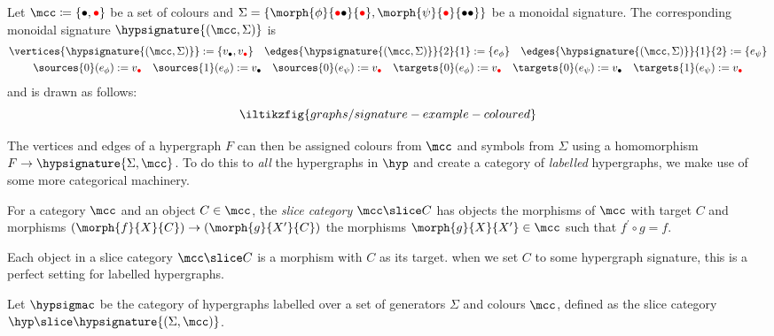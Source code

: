 \begin{example}\label{ex:labelled-hypergraph}
    Let \(\mcc \coloneqq \{\bullet,\redbullet\}\) be a set of colours and
    \(\Sigma = \{\morph{\phi}{\redbullet\bullet}{\redbullet}, \morph{\psi}{\redbullet}{\bullet\bullet}\}\) be a monoidal
    signature.
    The corresponding monoidal signature \(\hypsignature{(\mcc,\Sigma)}\) is
    \begin{gather*}
        \vertices{\hypsignature{(\mcc,\Sigma)}} := \{v_{\bullet},v_{\redbullet}\}
        \quad
        \edges{\hypsignature{(\mcc,\Sigma)}}{2}{1} := \{e_\phi\}
        \quad
        \edges{\hypsignature{(\mcc,\Sigma)}}{1}{2} := \{e_\psi\}
        \\
        \sources{0}(e_\phi) := v_{\redbullet}
        \quad
        \sources{1}(e_\phi) := v_{\bullet}
        \quad
        \sources{0}(e_\psi) := v_{\redbullet}
        \quad
        \targets{0}(e_\phi) := v_{\redbullet}
        \quad
        \targets{0}(e_\psi) := v_{\bullet}
        \quad
        \targets{1}(e_\psi) := v_{\redbullet}
    \end{gather*}
    and is drawn as follows:
    \[
        \iltikzfig{graphs/signature-example-coloured}
    \]
\end{example}

The vertices and edges of a hypergraph \(F\) can then be assigned colours from
\(\mcc\) and symbols from \(\Sigma\) using a homomorphism
\(F \to \hypsignature{\Sigma,\mcc}\).
To do this to \emph{all} the hypergraphs in \(\hyp\) and create a category of
\emph{labelled} hypergraphs, we make use of some more categorical machinery.

\begin{definition}
    For a category \(\mcc\) and an object \(C \in \mcc\), the
    \emph{slice category} \(\mcc \slice C\) has objects the morphisms of
    \(\mcc\) with target \(C\) and morphisms
    \((\morph{f}{X}{C}) \to (\morph{g}{X^\prime}{C})\) the morphisms
    \(\morph{g}{X}{X^\prime} \in \mcc\) such that \(f^\prime\circ g = f\).
\end{definition}

Each object in a slice category \(\mcc \slice C\) is a morphism with \(C\) as
its target.
when we set \(C\) to some hypergraph signature, this is a perfect setting for
labelled hypergraphs.

\begin{definition}
    Let \(\hypsigmac\) be the category of hypergraphs labelled over a set of
    generators \(\Sigma\) and colours \(\mcc\), defined as the slice category
    \(\hyp \slice \hypsignature{(\Sigma, \mcc)}\).
\end{definition}


